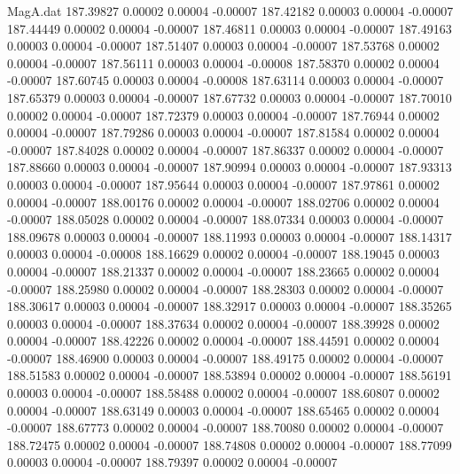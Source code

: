 \begin{filecontents}{MagA.dat}
 187.39827    0.00002    0.00004   -0.00007
 187.42182    0.00003    0.00004   -0.00007
 187.44449    0.00002    0.00004   -0.00007
 187.46811    0.00003    0.00004   -0.00007
 187.49163    0.00003    0.00004   -0.00007
 187.51407    0.00003    0.00004   -0.00007
 187.53768    0.00002    0.00004   -0.00007
 187.56111    0.00003    0.00004   -0.00008
 187.58370    0.00002    0.00004   -0.00007
 187.60745    0.00003    0.00004   -0.00008
 187.63114    0.00003    0.00004   -0.00007
 187.65379    0.00003    0.00004   -0.00007
 187.67732    0.00003    0.00004   -0.00007
 187.70010    0.00002    0.00004   -0.00007
 187.72379    0.00003    0.00004   -0.00007
 187.76944    0.00002    0.00004   -0.00007
 187.79286    0.00003    0.00004   -0.00007
 187.81584    0.00002    0.00004   -0.00007
 187.84028    0.00002    0.00004   -0.00007
 187.86337    0.00002    0.00004   -0.00007
 187.88660    0.00003    0.00004   -0.00007
 187.90994    0.00003    0.00004   -0.00007
 187.93313    0.00003    0.00004   -0.00007
 187.95644    0.00003    0.00004   -0.00007
 187.97861    0.00002    0.00004   -0.00007
 188.00176    0.00002    0.00004   -0.00007
 188.02706    0.00002    0.00004   -0.00007
 188.05028    0.00002    0.00004   -0.00007
 188.07334    0.00003    0.00004   -0.00007
 188.09678    0.00003    0.00004   -0.00007
 188.11993    0.00003    0.00004   -0.00007
 188.14317    0.00003    0.00004   -0.00008
 188.16629    0.00002    0.00004   -0.00007
 188.19045    0.00003    0.00004   -0.00007
 188.21337    0.00002    0.00004   -0.00007
 188.23665    0.00002    0.00004   -0.00007
 188.25980    0.00002    0.00004   -0.00007
 188.28303    0.00002    0.00004   -0.00007
 188.30617    0.00003    0.00004   -0.00007
 188.32917    0.00003    0.00004   -0.00007
 188.35265    0.00003    0.00004   -0.00007
 188.37634    0.00002    0.00004   -0.00007
 188.39928    0.00002    0.00004   -0.00007
 188.42226    0.00002    0.00004   -0.00007
 188.44591    0.00002    0.00004   -0.00007
 188.46900    0.00003    0.00004   -0.00007
 188.49175    0.00002    0.00004   -0.00007
 188.51583    0.00002    0.00004   -0.00007
 188.53894    0.00002    0.00004   -0.00007
 188.56191    0.00003    0.00004   -0.00007
 188.58488    0.00002    0.00004   -0.00007
 188.60807    0.00002    0.00004   -0.00007
 188.63149    0.00003    0.00004   -0.00007
 188.65465    0.00002    0.00004   -0.00007
 188.67773    0.00002    0.00004   -0.00007
 188.70080    0.00002    0.00004   -0.00007
 188.72475    0.00002    0.00004   -0.00007
 188.74808    0.00002    0.00004   -0.00007
 188.77099    0.00003    0.00004   -0.00007
 188.79397    0.00002    0.00004   -0.00007

\end{filecontents}
